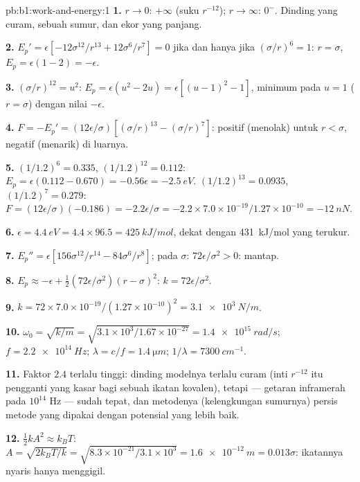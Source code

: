 \begin{solution}{pb:b1:work-and-energy:1}
\textbf{1.} $r \to 0$: $+\infty$ (suku $r^{-12}$); $r \to \infty$:
$0^-$. Dinding yang curam, sebuah sumur, dan ekor yang panjang.

\textbf{2.} $E_p' = \epsilon[-12\sigma^{12}/r^{13} + 12\sigma^6/r^7] = 0$ jika dan hanya jika
$(\sigma/r)^6 = 1$: $r = \sigma$, $E_p = \epsilon(1 - 2) = -\epsilon$.

\textbf{3.} $(\sigma/r)^{12} = u^2$: $E_p = \epsilon(u^2 - 2u) = \epsilon[(u - 1)^2
- 1]$, minimum pada $u = 1$ ($r = \sigma$) dengan nilai $-\epsilon$.

\textbf{4.} $F = -E_p' = (12\epsilon/\sigma)[(\sigma/r)^{13} - (\sigma/r)^7]$:
positif (menolak) untuk $r < \sigma$, negatif (menarik) di luarnya.

\textbf{5.} $(1/1.2)^6 = 0.335$, $(1/1.2)^{12} = 0.112$: $E_p = \epsilon(0.112
- 0.670) = -0.56\epsilon = \qty{-2.5}{eV}$. $(1/1.2)^{13} = 0.0935$,
$(1/1.2)^7 = 0.279$: $F = (12\epsilon/\sigma)(-0.186) = -2.2\epsilon/\sigma =
-2.2 \times 7.0\times10^{-19}/1.27\times10^{-10} = \qty{-12}{nN}$.

\textbf{6.} $\epsilon = \qty{4.4}{eV} = 4.4 \times 96.5 = \qty{425}{kJ/mol}$,
dekat dengan \qty{431}{kJ/mol} yang terukur.

\textbf{7.} $E_p'' = \epsilon[156\sigma^{12}/r^{14} - 84\sigma^6/r^8]$; pada
$\sigma$: $72\epsilon/\sigma^2 > 0$: mantap.

\textbf{8.} $E_p \approx -\epsilon + \tfrac12(72\epsilon/\sigma^2)(r - \sigma)^2$:
$k = 72\epsilon/\sigma^2$.

\textbf{9.} $k = 72 \times 7.0\times10^{-19}/(1.27\times10^{-10})^2 =
\qty{3.1e3}{N/m}$.

\textbf{10.} $\omega_0 = \sqrt{k/m} = \sqrt{3.1\times10^3/1.67\times10^{-27}} =
\qty{1.4e15}{rad/s}$; $f = \qty{2.2e14}{Hz}$; $\lambda = c/f = \qty{1.4}{\micro m}$;
$1/\lambda = \qty{7300}{cm^{-1}}$.

\textbf{11.} Faktor $2.4$ terlalu tinggi: dinding modelnya terlalu curam
(inti $r^{-12}$ itu pengganti yang kasar bagi sebuah ikatan kovalen),
tetapi  --- getaran inframerah pada $10^{14}$ Hz --- sudah
tepat, dan metodenya (kelengkungan sumurnya) persis metode yang dipakai
dengan potensial yang lebih baik.

\textbf{12.} $\tfrac12 kA^2 \approx k_BT$: $A = \sqrt{2k_BT/k} = \sqrt{8.3\times
10^{-21}/3.1\times10^3} = \qty{1.6e-12}{m} = 0.013\sigma$: ikatannya
nyaris hanya menggigil.


\end{solution}
